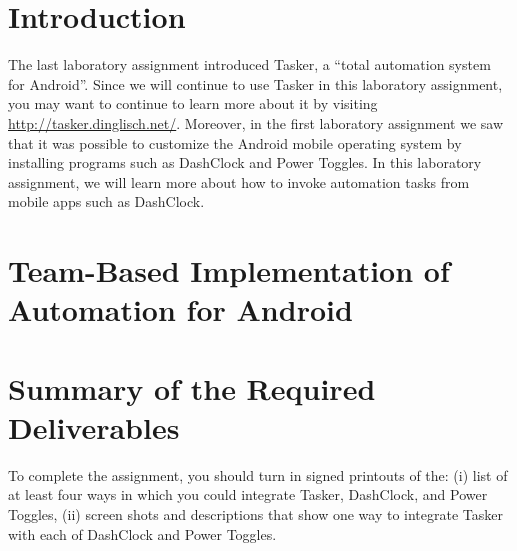 

\usepackage[compact]{titlesec}



\section*{Introduction}

The last laboratory assignment introduced Tasker, a ``total automation system for Android''.  Since we will continue to
use Tasker in this laboratory assignment, you may want to continue to learn more about it by visiting
\url{http://tasker.dinglisch.net/}. Moreover, in the first laboratory assignment we saw that it was possible to
customize the Android mobile operating system by installing programs such as DashClock and Power Toggles.  In this
laboratory assignment, we will learn more about how to invoke automation tasks from mobile apps such as DashClock.

\section*{Team-Based Implementation of Automation for Android}

\section*{Summary of the Required Deliverables}

To complete the assignment, you should turn in signed printouts of the: (i) list of at least four ways in which you
could integrate Tasker, DashClock, and Power Toggles, (ii) screen shots and descriptions that show one way to integrate
Tasker with each of DashClock and Power Toggles.


